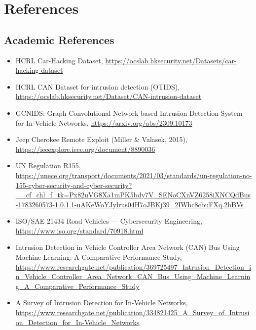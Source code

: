 \documentclass{article}
\begin{document}
\section{References}
\subsection{Academic References}
\begin{itemize}[noitemsep]
    \item HCRL Car-Hacking Dataset, \url{https://ocslab.hksecurity.net/Datasets/car-hacking-dataset}
    \item HCRL CAN Dataset for intrusion detection (OTIDS), \url{https://ocslab.hksecurity.net/Dataset/CAN-intrusion-dataset}
    \item GCNIDS: Graph Convolutional Network based Intrusion Detection System for In-Vehicle Networks, \url{https://arxiv.org/abs/2309.10173}
    \item Jeep Cherokee Remote Exploit (Miller \& Valasek, 2015), \url{https://ieeexplore.ieee.org/document/8890036}
    \item UN Regulation R155, \url{https://unece.org/transport/documents/2021/03/standards/un-regulation-no-155-cyber-security-and-cyber-security?__cf_chl_f_tk=Px82uVG8Xa1mPK5bdy7V_SENoCXnVZ6258iXNCQdBus-1783260573-1.0.1.1-uAKeWoYJylrus04H7oJBKj39_2IWhc8cbuFXq.2hBVs}
    \item ISO/SAE 21434 Road Vehicles — Cybersecurity Engineering, \url{https://www.iso.org/standard/70918.html}
    \item Intrusion Detection in Vehicle Controller Area Network (CAN) Bus Using Machine Learning: A Comparative Performance Study, \url{https://www.researchgate.net/publication/369725497_Intrusion_Detection_in_Vehicle_Controller_Area_Network_CAN_Bus_Using_Machine_Learning_A_Comparative_Performance_Study}
    \item A Survey of Intrusion Detection for In-Vehicle Networks, \url{https://www.researchgate.net/publication/334821425_A_Survey_of_Intrusion_Detection_for_In-Vehicle_Networks}
\end{itemize}
\end{document}
